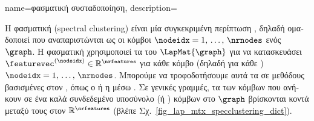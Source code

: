 {name={\foreignlanguage{greek}{φασματική συσταδοποίηση}},
	description={\foreignlanguage{greek}{Η φασματική}  
		(spectral clustering) \foreignlanguage{greek}{είναι μία συγκεκριμένη περίπτωση} , \foreignlanguage{greek}{δηλαδή 
		ομαδοποιεί}  \foreignlanguage{greek}{που αναπαριστώνται ως οι κόμβοι 
		$\nodeidx=1, \,\ldots, \,\nrnodes$ ενός}  $\graph$. \foreignlanguage{greek}{Η φασματική} 
		 \foreignlanguage{greek}{χρησιμοποιεί τα}  
		\foreignlanguage{greek}{του}  $\LapMat{\graph}$ \foreignlanguage{greek}{για να κατασκευάσει} 
		 $\featurevec^{(\nodeidx)} \in \mathbb{R}^{\nrfeatures}$ 
		\foreignlanguage{greek}{για κάθε κόμβο (δηλαδή για κάθε} ) $\nodeidx=1, \,\ldots, \,\nrnodes$. 
		\foreignlanguage{greek}{Μπορούμε να τροφοδοτήσουμε αυτά τα}  \foreignlanguage{greek}{σε 
		μεθόδους}  \foreignlanguage{greek}{βασισμένες στον} ,
		\foreignlanguage{greek}{όπως ο}  \foreignlanguage{greek}{ή η}  
		\foreignlanguage{greek}{μέσω} . \foreignlanguage{greek}{Σε γενικές γραμμές, τα} 
		\foreignlanguage{greek}{των κόμβων που ανήκουν σε ένα καλά συνδεδεμένο υποσύνολο (ή} 
		) \foreignlanguage{greek}{κόμβων στο $\graph$ βρίσκονται κοντά μεταξύ τους στον} 
		 $\mathbb{R}^{\nrfeatures}$ (\foreignlanguage{greek}{βλέπε Σχ.}\ \ref{fig_lap_mtx_specclustering_dict}). 
		\begin{figure}[H]
			\begin{center}
				\begin{minipage}{0.4\textwidth}
\end{minipage}
\end{center}
\end{figure}}}
